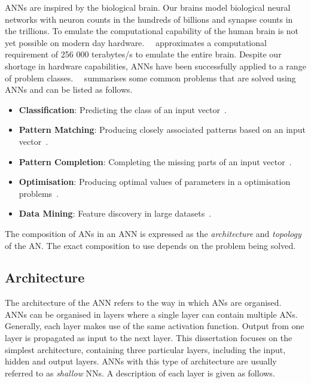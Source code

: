 \acp{ANN} are inspired by the biological brain. Our brains model biological neural networks with neuron counts in the hundreds of billions and synapse counts in the trillions. To emulate the computational capability of the human brain is not yet possible on modern day hardware.~\citeauthor{ref:sandberg:2008}~\cite{ref:sandberg:2008} approximates a computational requirement of 256 000 terabytes/s to emulate the entire brain. Despite our shortage in hardware capabilities, \acp{ANN} have been successfully applied to a range of problem classes.~\citeauthor{ref:engelbrecht:2007}~\cite{ref:engelbrecht:2007} summarises some common problems that are solved using \acp{ANN} and can be listed as follows.

\begin{itemize}
      \item \textbf{Classification}: Predicting the class of an input vector~\cite{ref:khan:2001}.

      \item \textbf{Pattern Matching}: Producing closely associated patterns based on an input vector~\cite{ref:cannady:1998, ref:kumar:1994}.

      \item \textbf{Pattern Completion}: Completing the missing parts of an input vector~\cite{ref:dayhoff:2001}.

      \item \textbf{Optimisation}: Producing optimal values of parameters in a optimisation problems~\cite{ref:specht:1991}.

      \item \textbf{Data Mining}: Feature discovery in large datasets~\cite{ref:singh:2009}.
\end{itemize}

\noindent
The composition of \acp{AN} in an \acs{ANN} is expressed as the \textit{architecture} and \textit{topology} of the \acs{AN}. The exact composition to use depends on the problem being solved.

\subsection{Architecture} \label{sec:anns:anns:architecture}

The architecture of the \acs{ANN} refers to the way in which \acp{AN} are organised. \acp{ANN} can be organised in layers where a single layer can contain multiple \acp{AN}. Generally, each layer makes use of the same activation function. Output from one layer is propagated as input to the next layer. This dissertation focuses on the simplest architecture, containing three particular layers, including the input, hidden and output layers. \acp{ANN} with this type of architecture are usually referred to as \textit{shallow} \acp{NN}. A description of each layer is given as follows.

